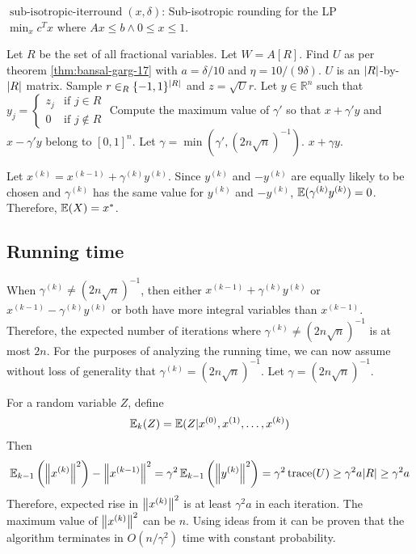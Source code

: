 \begin{algorithm}[H]
\caption{$\operatorname{sub-isotropic-iterround}(x, \delta)$:
Sub-isotropic rounding for the LP
${\min_x c^Tx \textrm{ where } Ax \le b \wedge 0 \le x \le 1}$.}
\begin{algorithmic}[1]
\State Let $R$ be the set of all fractional variables. Let $W = A[R]$.
\State Find $U$ as per theorem \ref{thm:bansal-garg-17}
with $a = \delta/10$ and $\eta = 10/(9\delta)$.
$U$ is an $\left\lvert R \right\rvert$-by-$\left\lvert R \right\rvert$ matrix.
\State Sample $r \in_R \{-1, 1\}^{\left\lvert R \right\rvert}$ and $z = \sqrt{U}r$.
\State Let $y \in \mathbb{R}^n$ such that
${\displaystyle y_j = \begin{cases} z_j & \textrm{if } j \in R
\\ 0 & \textrm{if } j \not\in R \end{cases} }$
\State Compute the maximum value of $\gamma'$ so that
$x + \gamma' y$ and $x - \gamma' y$ belong to $[0, 1]^n$.
\State Let $\gamma = \min(\gamma', (2n\sqrt{n})^{-1})$.
\State \Return $x + \gamma y$.
\end{algorithmic}
\end{algorithm}

Let $x^{(k)} = x^{(k-1)} + \gamma^{(k)}y^{(k)}$.
Since $y^{(k)}$ and $-y^{(k)}$ are equally likely to be chosen
and $\gamma^{(k)}$ has the same value for $y^{(k)}$ and $-y^{(k)}$,
$\operatorname{\mathbb{E}}(\gamma^{(k)}y^{(k)}) = 0$. Therefore, $\operatorname{\mathbb{E}}(X) = x^*$.

\subsection{Running time}

When $\gamma^{(k)} \neq (2n\sqrt{n})^{-1}$, then either $x^{(k-1)} + \gamma^{(k)}y^{(k)}$
or $x^{(k-1)} - \gamma^{(k)}y^{(k)}$ or both have more integral variables than $x^{(k-1)}$.
Therefore, the expected number of iterations where $\gamma^{(k)} \neq (2n\sqrt{n})^{-1}$
is at most $2n$. For the purposes of analyzing the running time, we can now assume
without loss of generality that $\gamma^{(k)} = (2n\sqrt{n})^{-1}$.
Let $\gamma = (2n\sqrt{n})^{-1}$.

For a random variable $Z$, define
\[ \operatorname{\mathbb{E}}_k(Z) = \operatorname{\mathbb{E}}(Z | x^{(0)}, x^{(1)}, \ldots, x^{(k)}) \]
Then
\[ \operatorname{\mathbb{E}}_{k-1}\left(\left\lVert x^{(k)} \right\rVert^2\right) - \left\lVert x^{(k-1)} \right\rVert^2
= \gamma^2 \operatorname{\mathbb{E}}_{k-1}\left(\left\lVert y^{(k)} \right\rVert^2\right)
= \gamma^2 \operatorname*{trace}(U) \ge \gamma^2 a |R| \ge \gamma^2 a \]
Therefore, expected rise in $\left\lVert x^{(k)} \right\rVert^2$ is at least $\gamma^2 a$ in each iteration.
The maximum value of $\left\lVert x^{(k)} \right\rVert^2$ can be $n$.
Using ideas from \cite{bansal10cadm} it can be proven that the algorithm terminates
in $O(n/\gamma^2)$ time with constant probability.

